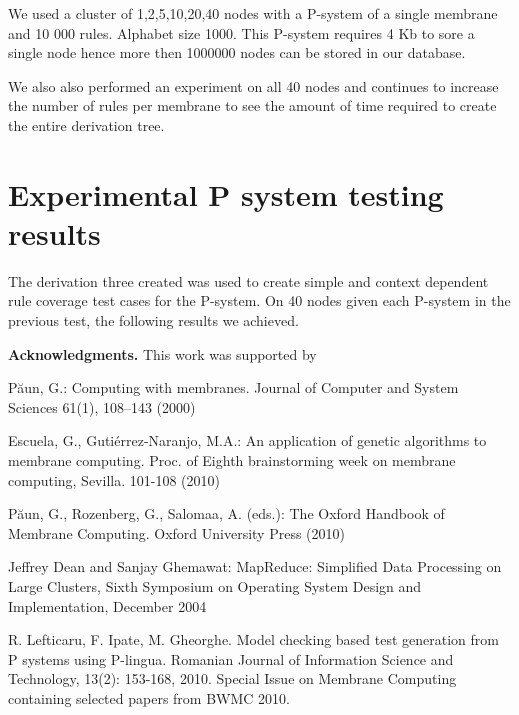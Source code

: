 \documentclass[runningheads]{llncs}
\begin{document}
We used a cluster of 1,2,5,10,20,40 nodes with a P-system of a single membrane and 10 000 rules. Alphabet size 1000. This P-system requires 4 Kb to sore a single node hence more then 1000000 nodes can be stored in our database. 

We also also performed an experiment on all 40 nodes and continues to increase the number of rules per membrane to see the amount of time required to create the entire derivation tree. 

\section{Experimental P system testing results}

The derivation three created was used to create simple and context dependent rule coverage test cases for the P-system. On 40 nodes given each P-system in the previous test, the following results we achieved. 


\textbf{Acknowledgments.}
This work was supported by


\begin{thebibliography}{99}

P\u{a}un, G.: Computing with membranes. Journal of Computer and System Sciences 61(1),  108--143 (2000)

Escuela, G., Guti\'errez-Naranjo, M.A.: An application of genetic algorithms to
membrane computing. Proc. of Eighth brainstorming week on membrane computing, Sevilla. 101-108 (2010)

P\u{a}un, G., Rozenberg, G., Salomaa, A. (eds.): The Oxford Handbook of Membrane Computing. Oxford University Press (2010)

Jeffrey Dean and Sanjay Ghemawat: MapReduce: Simplified Data Processing on Large Clusters, Sixth Symposium on Operating System Design and Implementation, December 2004
 

R. Lefticaru, F. Ipate, M. Gheorghe. Model checking based test generation from P systems using P-lingua. Romanian Journal of Information Science and Technology, 13(2): 153-168, 2010. Special Issue on Membrane Computing containing selected papers from BWMC 2010.

\end{thebibliography}
\end{document}
